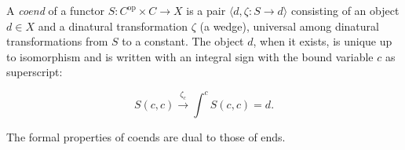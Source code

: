 A \emph{coend} of a functor $S: C^{\text{op}} \times C \rightarrow X$ is a pair $\langle d, \zeta: S \rightarrow d \rangle$ consisting of an object $d \in X$ and a dinatural transformation $\zeta$ (a wedge), universal among dinatural transformations from $S$ to a constant. The object $d$, when it exists, is unique up to isomorphism and is written with an integral sign with the bound variable $c$ as superscript:

$$S(c, c) \xrightarrow{\zeta_c} \int^{c} S(c, c) = d.$$

The formal properties of coends are dual to those of ends.
